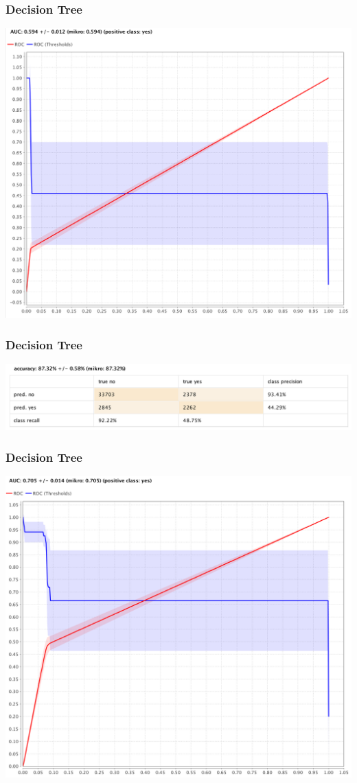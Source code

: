 \documentclass{beamer}
\begin{document}
\begin{frame}
	\frametitle{Decision Tree}
  \includegraphics[width=\textwidth,height=\textheight,keepaspectratio]{dt-aa-roc}
\end{frame}

\begin{frame}
	\frametitle{Decision Tree}
  \includegraphics[width=\textwidth,height=\textheight,keepaspectratio]{dt-ra-s}
\end{frame}

\begin{frame}
	\frametitle{Decision Tree}
  \includegraphics[width=\textwidth,height=\textheight,keepaspectratio]{dt-ra-s-roc}
\end{frame}
\end{document}
